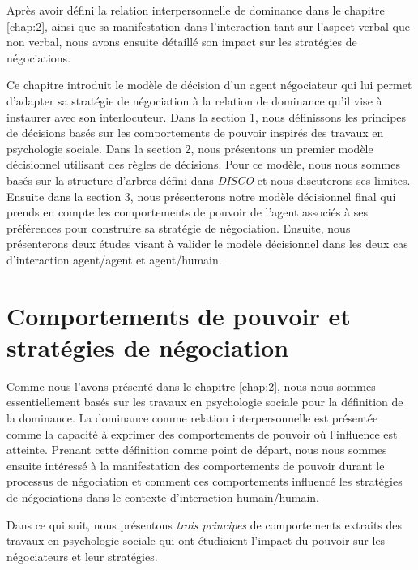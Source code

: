 Après avoir défini la relation interpersonnelle de dominance dans le chapitre \ref{chap:2}, ainsi que sa manifestation dans l'interaction tant sur l'aspect verbal que non verbal, nous avons ensuite détaillé son impact sur les stratégies de négociations. 

Ce chapitre introduit le modèle de décision d'un agent négociateur qui lui permet d'adapter sa stratégie de négociation à la relation de dominance qu'il vise à instaurer avec son interlocuteur. Dans la section 1, nous définissons les principes de décisions basés sur les comportements de pouvoir inspirés des travaux en psychologie sociale. Dans la section 2, nous présentons un premier modèle décisionnel utilisant des règles de décisions.  Pour ce modèle, nous nous sommes basés sur la structure d'arbres défini dans \emph{DISCO} \cite{ri} et nous discuterons ses limites. Ensuite dans la section 3, nous présenterons notre modèle décisionnel final qui prends en compte les comportements de pouvoir de l'agent associés à ses préférences pour construire sa stratégie de négociation. Ensuite, nous présenterons deux études visant à valider le modèle décisionnel dans les deux cas d'interaction agent/agent et agent/humain.

\section{Comportements de pouvoir et stratégies de négociation}

 Comme nous l'avons présenté dans le chapitre \ref{chap:2}, nous nous sommes essentiellement basés sur les travaux en psychologie sociale pour la définition de la dominance. 
 La dominance comme relation interpersonnelle est présentée comme la capacité à exprimer des comportements de pouvoir où l'influence est atteinte. Prenant cette définition comme point de départ, nous nous sommes ensuite intéressé à la manifestation des comportements de pouvoir durant le processus de négociation et comment ces comportements influencé les stratégies de négociations dans le contexte d'interaction humain/humain. 
 
 Dans ce qui suit, nous présentons \emph{trois principes} de comportements extraits des travaux en psychologie sociale qui ont étudiaient l'impact du pouvoir sur les négociateurs et leur stratégies.
 
